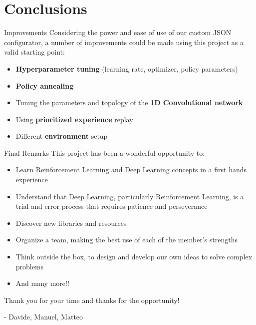 \documentclass[10pt, xcolor={dvipsnames}]{beamer}
\begin{document}


\section{Conclusions}
\begin{frame}{Improvements}
    Considering the power and ease of use of our custom JSON configurator, a number of \alert{improvements} could be made using this project as a valid starting point:
    \begin{itemize}
        \item \textbf{Hyperparameter tuning} (learning rate, optimizer, policy parameters)
        \item  \textbf{Policy annealing}
        \item Tuning the parameters and topology of the \textbf{1D Convolutional network}
        \item Using \textbf{prioritized experience} replay
        \item Different \textbf{environment} setup
    \end{itemize}
\end{frame}

\begin{frame}{Final Remarks}
This project has been a wonderful opportunity to:
\begin{itemize}
    \item \alert{Learn} Reinforcement Learning and Deep Learning concepts in a first hands experience
    \item \alert{Understand} that Deep Learning, particularly Reinforcement Learning, is a trial and error process that requires patience and perseverance
    \item \alert{Discover} new libraries and resources
    \item \alert{Organize} a team, making the best use of each of the  member's strengths
    \item \alert{Think outside the box}, to design and develop our own ideas to solve complex problems 
    \item And many more!!
    
\end{itemize}
\end{frame}

{
\begin{frame}
    \vspace{2cm}
    \centering
    \large{Thank you for your time and thanks for the opportunity!}

    \vspace{0.3cm}
    \begin{flushright}
        \small{- Davide, Manuel, Matteo}
    \end{flushright}
\end{frame}
}
\end{document}
